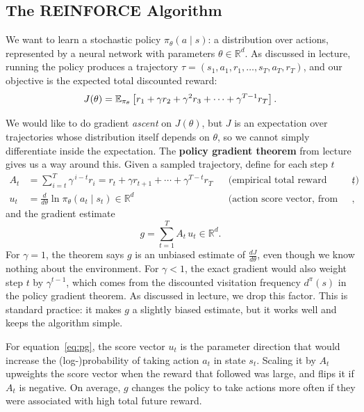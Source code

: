 \subsection{The REINFORCE Algorithm}

We want to learn a stochastic policy $\pi_\theta(a \mid s)$: a distribution over
actions, represented by a neural network with parameters $\theta \in \mathbb{R}^d$.
As discussed in lecture, running the policy produces a trajectory
$\tau = (s_1, a_1, r_1, \dots, s_T, a_T, r_T)$, and our objective is the expected
total discounted reward:
\begin{equation}
    J(\theta) = \mathbb{E}_{\pi_\theta}\left[ r_1 + \gamma r_2 + \gamma^2 r_3 + \cdots + \gamma^{T-1} r_T \right].
\end{equation}

We would like to do gradient \emph{ascent} on $J(\theta)$, but $J$ is an
expectation over trajectories whose distribution itself depends on $\theta$, so
we cannot simply differentiate inside the expectation. The \textbf{policy gradient
theorem} from lecture gives us a way around this. Given a sampled trajectory,
define for each step $t$
\begin{align}
    \label{eq:returns}
    A_t &= \sum_{i=t}^{T} \gamma^{\,i-t} r_i
         = r_t + \gamma r_{t+1} + \cdots + \gamma^{T-t} r_T
         && \text{(empirical total reward starting from step $t$)}, \\
    u_t &= \frac{d}{d\theta} \ln \pi_\theta(a_t \mid s_t) \in \mathbb{R}^d
         && \text{(action score vector, from autodiff)},
\end{align}
and the gradient estimate
\begin{equation}
    \label{eq:pg}
    g = \sum_{t=1}^{T} A_t \, u_t \in \mathbb{R}^d.
\end{equation}
For $\gamma = 1$, the theorem says $g$ is an unbiased estimate of
$\frac{dJ}{d\theta}$, even though we know nothing about the environment. For
$\gamma < 1$, the exact gradient would also weight step $t$ by $\gamma^{t-1}$,
which comes from the discounted visitation frequency $d^\pi(s)$ in the policy
gradient theorem. As discussed in lecture, we drop this factor. This is standard practice: it makes $g$ a
slightly biased estimate, but it works well and keeps the algorithm simple.

For equation~\ref{eq:pg}, the score vector $u_t$ is the
parameter direction that would increase the (log-)probability of taking action
$a_t$ in state $s_t$. Scaling it by $A_t$ upweights the score vector when the
reward that followed was large, and flips it if $A_t$ is negative. On average,
$g$ changes the policy to take actions more often if they were associated with
high total future reward.

